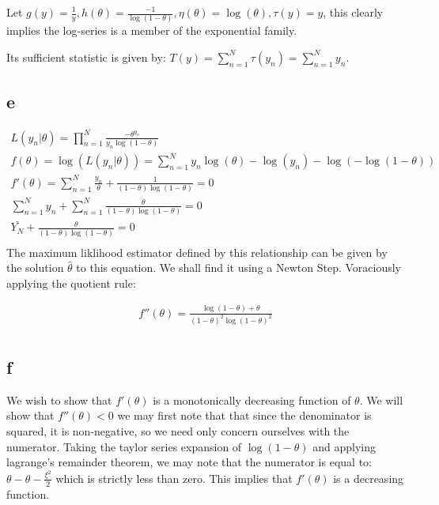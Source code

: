 \documentclass[10pt]{paper}\usepackage[]{graphicx}\usepackage[]{color}
\begin{document}
Let $g(y) = \frac{1}{y}, h(\theta) = \frac{-1}{\log(1-\theta)}, \eta(\theta) = \log(\theta),
\tau(y) = y$, this clearly implies the log-series is a member of the
exponential family.

Its sufficient statistic is given by: $T(y) = \sum_{n=1}^N \tau(y_n) =
\sum_{n=1}^N y_n$.

\subsection*{e}

\begin{align*}
  L( y_n | \theta) = \prod_{n=1}^N \frac{ - \theta^{y_n}}{y_n \log( 1 - \theta)}\\
  f( \theta ) = \log( L( y_n | \theta ) ) = \sum_{n=1}^N y_n \log( \theta ) - \log( y_n ) - \log( - \log( 1- \theta ) )\\
  f'( \theta ) = \sum_{n=1}^N \frac{y_n }{\theta} + \frac{1}{(1-\theta) \log( 1- \theta )} = 0\\
  \sum_{n=1}^N y_n + \sum_{n=1}^N \frac{\theta}{(1-\theta)\log(1-\theta)} = 0\\
  \bar{Y_N} + \frac{\theta}{(1-\theta)\log(1-\theta)} = 0\\
\end{align*}
The maximum liklihood estimator defined by this relationship can be
given by the solution $\hat{\theta}$ to this equation. We shall find it
using a Newton Step. Voraciously applying the quotient rule:

\begin{align*}
  f''(\theta) = \frac{\log(1-\theta) + \theta}{(1-\theta)^2 \log( 1- \theta)^2}\\
\end{align*}

\subsection*{f}


We wish to show that $f'(\theta)$ is a monotonically decreasing function
of $\theta$. We will show that $f''(\theta) < 0$ we may first note that that since the denominator is squared,
it is non-negative, so we need only concern ourselves with the
numerator. Taking the taylor series expansion of $\log( 1- \theta)$ and
applying lagrange's remainder theorem, we may note that the numerator
is equal to: $\theta - \theta - \frac{\xi^2}{2}$ which is strictly less than
zero. This implies that $f'(\theta)$ is a decreasing function.
\end{document}
